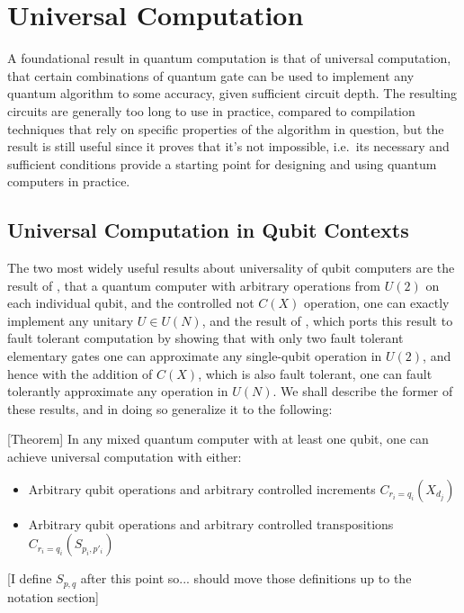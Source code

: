 \chapter[UNIVERSAL COMPUTATION]{Universal Computation}

A foundational result in quantum computation is that of universal computation, that certain combinations of quantum gate can be used to implement any quantum algorithm to some accuracy, given sufficient circuit depth. The resulting circuits are generally too long to use in practice, compared to compilation techniques that rely on specific properties of the algorithm in question, but the result is still useful since it proves that it's not impossible, i.e.\ its necessary and sufficient conditions provide a starting point for designing and using quantum computers in practice.

\section{Universal Computation in Qubit Contexts}
The two most widely useful results about universality of qubit computers are the result of \cite{cnot-decomposition}, that a quantum computer with arbitrary operations from $U(2)$ on each individual qubit, and the controlled not $C(X)$ operation, one can exactly implement any unitary $U \in U(N)$, and the result of \cite{universal-qubit}, which ports this result to fault tolerant computation by showing that with only two fault tolerant elementary gates one can approximate any single-qubit operation in $U(2)$, and hence with the addition of $C(X)$, which is also fault tolerant, one can fault tolerantly approximate any operation in $U(N)$. We shall describe the former of these results, and in doing so generalize it to the following:

[Theorem] In any mixed quantum computer with at least one qubit, one can achieve universal computation with either:
\begin{itemize}
	\item Arbitrary qubit operations and arbitrary controlled increments $C_{r_i=q_i}(X_{d_j})$
	\item Arbitrary qubit operations and arbitrary controlled transpositions $C_{r_i=q_i}(S_{p_i,p'_i})$
\end{itemize}
[I define $S_{p,q}$ after this point so... should move those definitions up to the notation section]

